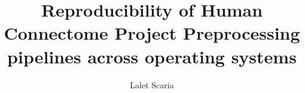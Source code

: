 \author{Lalet Scaria}
\title{Reproducibility of Human Connectome Project Preprocessing pipelines across operating systems}

